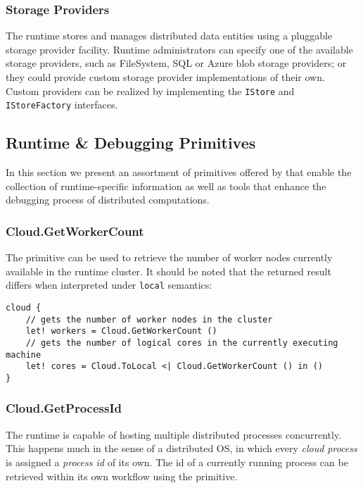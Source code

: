 \subsubsection*{\TitularMbrace{} Storage Providers}

The \mbrace{} runtime stores and manages distributed data entities using a
pluggable storage provider facility. Runtime administrators can specify one
of the available storage providers, such as FileSystem, SQL or Azure blob storage
providers; or they could provide custom storage provider implementations of their own.
Custom providers can be realized by implementing the \texttt{IStore} and
\texttt{IStoreFactory} interfaces.

\subsection{Runtime \& Debugging Primitives}

In this section we present an assortment of primitives offered by \mbrace{}
that enable the collection of runtime-specific information as well as tools
that enhance the debugging process of distributed computations.

\subsubsection*{Cloud.GetWorkerCount}

The primitive
can be used to retrieve the number of worker nodes currently available in the 
runtime cluster. It should be noted that the returned result differs when
interpreted under \texttt{local} semantics:
\begin{lstlisting}
cloud {
	// gets the number of worker nodes in the cluster
	let! workers = Cloud.GetWorkerCount ()
	// gets the number of logical cores in the currently executing machine
	let! cores = Cloud.ToLocal <| Cloud.GetWorkerCount () in ()
}
\end{lstlisting}

\subsubsection*{Cloud.GetProcessId}

The \mbrace{} runtime is capable of hosting multiple distributed processes concurrently.
This happens much in the sense of a distributed OS, in which every \emph{cloud process}
is assigned a \emph{process id} of its own. The id of a currently running process can
be retrieved within its own workflow using the
primitive.

